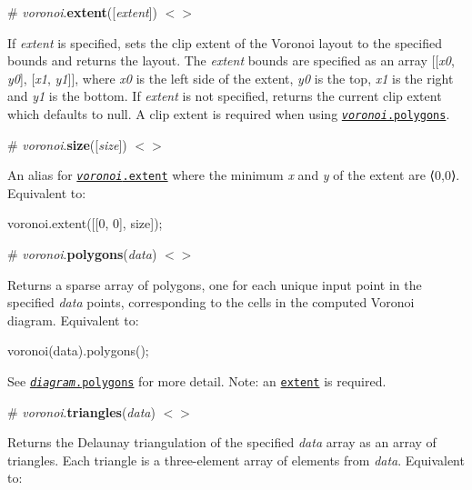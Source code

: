 \label{_voronoi_extent}%
\# {\itshape voronoi}.{\bfseries extent}(\mbox{[}{\itshape extent}\mbox{]}) \href{https://github.com/d3/d3-voronoi/blob/master/src/voronoi.js#L39}{\tt $<$$>$}

If {\itshape extent} is specified, sets the clip extent of the Voronoi layout to the specified bounds and returns the layout. The {\itshape extent} bounds are specified as an array \mbox{[}\mbox{[}{\itshape x0}, {\itshape y0}\mbox{]}, \mbox{[}{\itshape x1}, {\itshape y1}\mbox{]}\mbox{]}, where {\itshape x0} is the left side of the extent, {\itshape y0} is the top, {\itshape x1} is the right and {\itshape y1} is the bottom. If {\itshape extent} is not specified, returns the current clip extent which defaults to null. A clip extent is required when using \href{#voronoi_polygons}{\tt {\itshape voronoi}.polygons}.

\label{_voronoi_size}%
\# {\itshape voronoi}.{\bfseries size}(\mbox{[}{\itshape size}\mbox{]}) \href{https://github.com/d3/d3-voronoi/blob/master/src/voronoi.js#L43}{\tt $<$$>$}

An alias for \href{#voronoi_extent}{\tt {\itshape voronoi}.extent} where the minimum {\itshape x} and {\itshape y} of the extent are ⟨0,0⟩. Equivalent to\+:


\begin{DoxyCode}
voronoi.extent([[0, 0], size]);
\end{DoxyCode}


\label{_voronoi_polygons}%
\# {\itshape voronoi}.{\bfseries polygons}({\itshape data}) \href{https://github.com/d3/d3-voronoi/blob/master/src/voronoi.js#L19}{\tt $<$$>$}

Returns a sparse array of polygons, one for each unique input point in the specified {\itshape data} points, corresponding to the cells in the computed Voronoi diagram. Equivalent to\+:


\begin{DoxyCode}
voronoi(data).polygons();
\end{DoxyCode}


See \href{#diagram_polygons}{\tt {\itshape diagram}.polygons} for more detail. Note\+: an \href{#voronoi_extent}{\tt extent} is required.

\label{_voronoi_triangles}%
\# {\itshape voronoi}.{\bfseries triangles}({\itshape data}) \href{https://github.com/d3/d3-voronoi/blob/master/src/voronoi.js#L27}{\tt $<$$>$}

Returns the Delaunay triangulation of the specified {\itshape data} array as an array of triangles. Each triangle is a three-\/element array of elements from {\itshape data}. Equivalent to\+:


